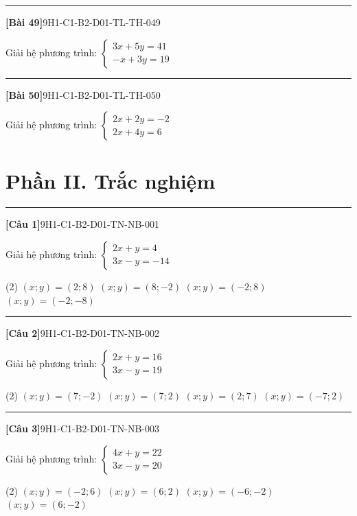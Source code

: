 \documentclass[12pt,a4paper]{article}
\newif\ifloigiai
\newenvironment{cauhoi}[2]{%
  \par\medskip\noindent\rule{\textwidth}{0.4pt}\par\nopagebreak
  \noindent\textbf{[#1]}\hfill{\scriptsize\ttfamily #2}\par\nopagebreak\smallskip}{\par}
\newcommand{\loigiai}[1]{\ifloigiai\par\smallskip\noindent\textit{Lời giải.} #1\par\fi}
\newcommand{\dapan}[1]{\ifloigiai\par\smallskip\noindent\textit{Đáp án:} \textbf{#1}\par\fi}
\begin{document}
\begin{cauhoi}{Bài 49}{9H1-C1-B2-D01-TL-TH-049}
Giải hệ phương trình: $\begin{cases}3x + 5y=41\\ -x + 3y=19\end{cases}$
\loigiai{Nhân hai vế của phương trình thứ nhất với $3$ và phương trình thứ hai với $-5$ rồi cộng từng vế để khử $y$: $14x=28$, suy ra $x=2$. Thay $x=2$ vào phương trình thứ nhất: $3\cdot(2)+5y=41$, suy ra $y=7$. Vậy hệ có nghiệm $(x;y)=(2;7)$.}
\end{cauhoi}
\begin{cauhoi}{Bài 50}{9H1-C1-B2-D01-TL-TH-050}
Giải hệ phương trình: $\begin{cases}2x + 2y=-2\\ 2x + 4y=6\end{cases}$
\loigiai{Nhân hai vế của phương trình thứ nhất với $2$ và phương trình thứ hai với $-1$ rồi cộng từng vế để khử $y$: $2x=-10$, suy ra $x=-5$. Thay $x=-5$ vào phương trình thứ nhất: $2\cdot(-5)+2y=-2$, suy ra $y=4$. Vậy hệ có nghiệm $(x;y)=(-5;4)$.}
\end{cauhoi}
\clearpage\section*{Phần II. Trắc nghiệm}
\begin{cauhoi}{Câu 1}{9H1-C1-B2-D01-TN-NB-001}
Giải hệ phương trình: $\begin{cases}2x + y=4\\ 3x - y=-14\end{cases}$
\begin{tasks}(2)
\task $(x;y)=(2;8)$
\task $(x;y)=(8;-2)$
\task $(x;y)=(-2;8)$
\task $(x;y)=(-2;-8)$
\end{tasks}
\dapan{C}
\end{cauhoi}
\begin{cauhoi}{Câu 2}{9H1-C1-B2-D01-TN-NB-002}
Giải hệ phương trình: $\begin{cases}2x + y=16\\ 3x - y=19\end{cases}$
\begin{tasks}(2)
\task $(x;y)=(7;-2)$
\task $(x;y)=(7;2)$
\task $(x;y)=(2;7)$
\task $(x;y)=(-7;2)$
\end{tasks}
\dapan{B}
\end{cauhoi}
\begin{cauhoi}{Câu 3}{9H1-C1-B2-D01-TN-NB-003}
Giải hệ phương trình: $\begin{cases}4x + y=22\\ 3x - y=20\end{cases}$
\begin{tasks}(2)
\task $(x;y)=(-2;6)$
\task $(x;y)=(6;2)$
\task $(x;y)=(-6;-2)$
\task $(x;y)=(6;-2)$
\end{tasks}
\dapan{D}
\end{cauhoi}
\end{document}
